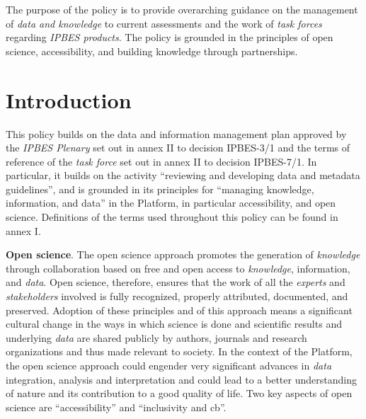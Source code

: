 \documentclass{article}
\begin{document}
The purpose of the policy is to provide overarching guidance on the management of \textit{data and knowledge }to current assessments and the work of \textit{task forces} regarding \textit{IPBES products}. The policy is grounded in the principles of open science, accessibility, and building knowledge through partnerships.

\section*{Introduction}

This policy builds on the data and information management plan approved by the \textit{IPBES Plenary} set out in annex II to decision IPBES-3/1 and the terms of reference of the \textit{task force} set out in annex II to decision IPBES-7/1. In particular, it builds on the activity “reviewing and developing data and metadata guidelines”, and is grounded in its principles for “managing knowledge, information, and data” in the Platform, in particular accessibility, and open science. Definitions of the terms used throughout this policy can be found in annex I.

\textbf{Open science}. The open science approach promotes the generation of \textit{knowledge }through collaboration based on free and open access to \textit{knowledge}, information, and \textit{data}. Open science, therefore, ensures that the work of all the \textit{experts} and \textit{stakeholders} involved is fully recognized, properly attributed, documented, and preserved. Adoption of these principles and of this approach means a significant cultural change in the ways in which science is done and scientific results and underlying \textit{data} are shared publicly by authors, journals and research organizations and thus made relevant to society. In the context of the Platform, the open science approach could engender very significant advances in \textit{data} integration, analysis and interpretation and could lead to a better understanding of nature and its contribution to a good quality of life. Two key aspects of open science are “accessibility” and “inclusivity and \gls{cb}”.
\end{document}
